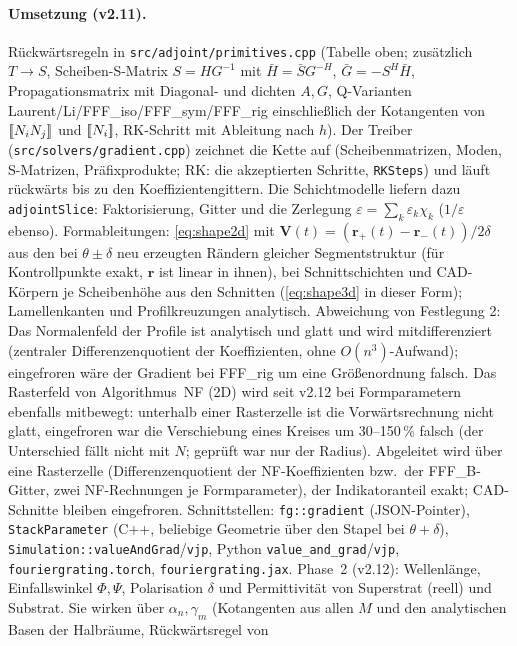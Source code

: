 \paragraph{Umsetzung (v2.11).} Rückwärtsregeln in \verb|src/adjoint/primitives.cpp| (Tabelle oben; zusätzlich
$T\to S$, Scheiben-S-Matrix $S=HG^{-1}$ mit $\bar H=\bar SG^{-H}$, $\bar G=-S^H\bar H$, Propagationsmatrix mit Diagonal-
und dichten $A,G$, Q-Varianten Laurent/Li/FFF\_iso/FFF\_sym/FFF\_rig einschließlich der Kotangenten von $[\![N_iN_j]\!]$ und
$[\![N_i]\!]$, RK-Schritt mit Ableitung nach $h$). Der Treiber (\verb|src/solvers/gradient.cpp|) zeichnet die Kette auf
(Scheibenmatrizen, Moden, S-Matrizen, Präfixprodukte; RK: die akzeptierten Schritte, \verb|RKSteps|) und läuft
rückwärts bis zu den Koeffizientengittern. Die Schichtmodelle liefern dazu \verb|adjointSlice|: Faktorisierung,
Gitter und die Zerlegung $\varepsilon=\sum_k\varepsilon_k\chi_k$ ($1/\varepsilon$ ebenso). Formableitungen:
\eqref{eq:shape2d} mit $\mathbf V(t)=(\mathbf r_+(t)-\mathbf r_-(t))/2\delta$ aus den bei $\theta\pm\delta$ neu
erzeugten Rändern gleicher Segmentstruktur (für Kontrollpunkte exakt, $\mathbf r$ ist linear in ihnen), bei
Schnittschichten und CAD-Körpern je Scheibenhöhe aus den Schnitten (\eqref{eq:shape3d} in dieser Form);
Lamellenkanten und Profilkreuzungen analytisch. Abweichung von Festlegung 2: Das Normalenfeld der Profile ist
analytisch und glatt und wird mitdifferenziert (zentraler Differenzenquotient der Koeffizienten, ohne
$O(n^3)$-Aufwand); eingefroren wäre der Gradient bei FFF\_rig um eine Größenordnung falsch. Das Rasterfeld von
Algorithmus~NF (2D) wird seit v2.12 bei Formparametern ebenfalls mitbewegt: unterhalb einer Rasterzelle ist die
Vorwärtsrechnung nicht glatt, eingefroren war die Verschiebung eines Kreises um 30--150\,\% falsch (der Unterschied
fällt nicht mit $N$; geprüft war nur der Radius). Abgeleitet wird über eine Rasterzelle (Differenzenquotient der
NF-Koeffizienten bzw.\ der FFF\_B-Gitter, zwei NF-Rechnungen je Formparameter), der Indikatoranteil exakt; CAD-Schnitte
bleiben eingefroren. Schnittstellen: \verb|fg::gradient| (JSON-Pointer), \verb|StackParameter|
(C++, beliebige Geometrie über den Stapel bei $\theta+\delta$), \verb|Simulation::valueAndGrad|/\verb|vjp|, Python
\verb|value_and_grad|/\verb|vjp|, \verb|fouriergrating.torch|, \verb|fouriergrating.jax|. Phase~2 (v2.12): Wellenlänge,
Einfallswinkel $\Phi,\Psi$, Polarisation $\delta$ und Permittivität von Superstrat (reell) und Substrat. Sie wirken über
$\alpha_n,\gamma_m$ (Kotangenten aus allen $M$ und den analytischen Basen der Halbräume, Rückwärtsregel von
